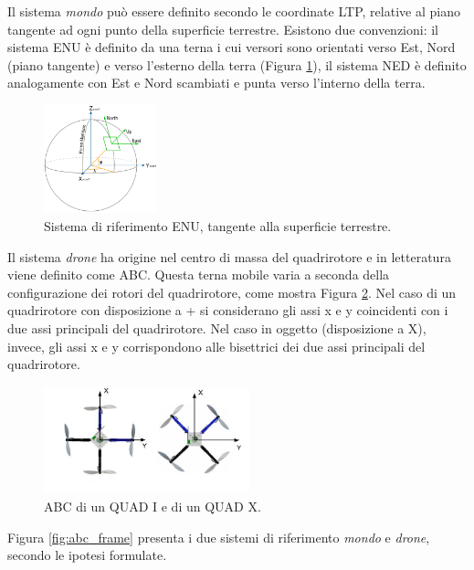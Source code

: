 Il sistema \emph{mondo} può essere definito secondo le coordinate \ac{LTP}, relative al piano tangente ad ogni punto della superficie terrestre. Esistono due convenzioni: il sistema \ac{ENU} è definito da una terna i cui versori sono orientati verso Est, Nord (piano tangente) e verso l'esterno della terra (Figura \ref{fig:fixedRef}), il sistema \ac{NED} è definito analogamente con Est e Nord scambiati e punta verso l'interno della terra.

\begin{figure}[H]
    \centering
    \includegraphics[width=0.29\textwidth]{gfx/ltp_enu}
    \caption[Sistema di riferimento \acs{ENU}.]{Sistema di riferimento \acs{ENU}, tangente alla superficie terrestre.}
    \label{fig:fixedRef}
\end{figure}

Il sistema \emph{drone} ha origine nel centro di massa del quadrirotore e in letteratura viene definito come \ac{ABC}. Questa terna mobile varia a seconda della configurazione dei rotori del quadrirotore, come mostra Figura \ref{fig:+andx}. Nel caso di un quadrirotore con disposizione a + si considerano gli assi x e y coincidenti con i due assi principali del quadrirotore. Nel caso in oggetto (disposizione a X), invece, gli assi x e y corrispondono alle bisettrici dei due assi principali del quadrirotore.

\begin{figure}[H]
    \centering
    \includegraphics[width=0.53\textwidth]{gfx/+andx}
    \caption[\acs{ABC} di un QUAD I e di un QUAD X.]{\acs{ABC} di un QUAD I e di un QUAD X.}
    \label{fig:+andx}
\end{figure}

Figura \ref{fig:abc_frame} presenta i due sistemi di riferimento \emph{mondo} e \emph{drone}, secondo le ipotesi formulate.

